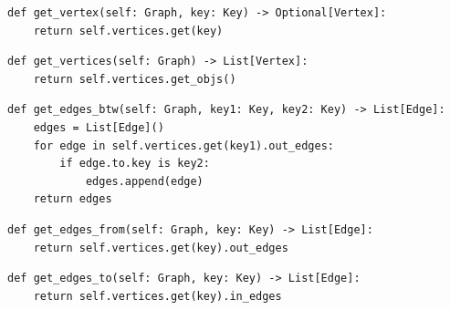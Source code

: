\documentclass[mathserif, handout]{beamer}
\begin{document}
\begin{frame}[fragile]
	\begin{proofbox}
		\begin{lstlisting}[style=mypython]
def get_vertex(self: Graph, key: Key) -> Optional[Vertex]:
    return self.vertices.get(key)
\end{lstlisting}
	\end{proofbox}
\end{frame}

\begin{frame}[fragile]
	\begin{proofbox}
		\begin{lstlisting}[style=mypython]
def get_vertices(self: Graph) -> List[Vertex]:
    return self.vertices.get_objs()
\end{lstlisting}
	\end{proofbox}
\end{frame}

\begin{frame}[fragile]
	\begin{proofbox}
		\begin{lstlisting}[style=mypython]
def get_edges_btw(self: Graph, key1: Key, key2: Key) -> List[Edge]:
    edges = List[Edge]()
    for edge in self.vertices.get(key1).out_edges:
        if edge.to.key is key2:
            edges.append(edge)
    return edges
\end{lstlisting}
	\end{proofbox}
\end{frame}

\begin{frame}[fragile]
	\begin{proofbox}
		\begin{lstlisting}[style=mypython]
def get_edges_from(self: Graph, key: Key) -> List[Edge]:
    return self.vertices.get(key).out_edges    
\end{lstlisting}
	\end{proofbox}
\end{frame}

\begin{frame}[fragile]
	\begin{proofbox}
		\begin{lstlisting}[style=mypython]
def get_edges_to(self: Graph, key: Key) -> List[Edge]:
    return self.vertices.get(key).in_edges  
\end{lstlisting}
	\end{proofbox}
\end{frame}
\end{document}
